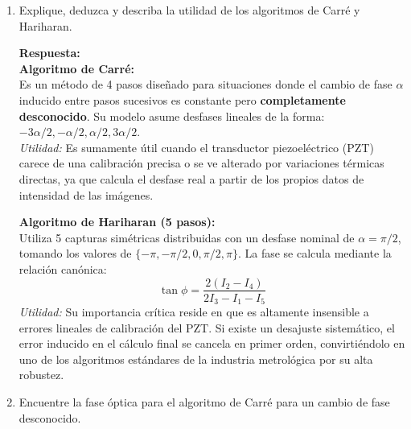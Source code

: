 \documentclass[12pt,letterpaper]{article}
\begin{document}
\begin{enumerate}
		\item[6.-] Explique, deduzca y describa la utilidad de los algoritmos de Carré y Hariharan.
		
		\vspace{0.3cm}
		\textbf{Respuesta:} \\
		\textbf{Algoritmo de Carré:} \\
		Es un método de 4 pasos diseñado para situaciones donde el cambio de fase $\alpha$ inducido entre pasos sucesivos es constante pero \textbf{completamente desconocido}. Su modelo asume desfases lineales de la forma: $-3\alpha/2, -\alpha/2, \alpha/2, 3\alpha/2$. \\
		\textit{Utilidad:} Es sumamente útil cuando el transductor piezoeléctrico (PZT) carece de una calibración precisa o se ve alterado por variaciones térmicas directas, ya que calcula el desfase real a partir de los propios datos de intensidad de las imágenes.
		
		\vspace{0.2cm}
		\textbf{Algoritmo de Hariharan (5 pasos):} \\
		Utiliza 5 capturas simétricas distribuidas con un desfase nominal de $\alpha = \pi/2$, tomando los valores de $\{- \pi, -\pi/2, 0, \pi/2, \pi\}$. La fase se calcula mediante la relación canónica:
		\[ \tan\phi = \frac{2(I_2 - I_4)}{2I_3 - I_1 - I_5} \]
		\textit{Utilidad:} Su importancia crítica reside en que es altamente insensible a errores lineales de calibración del PZT. Si existe un desajuste sistemático, el error inducido en el cálculo final se cancela en primer orden, convirtiéndolo en uno de los algoritmos estándares de la industria metrológica por su alta robustez.
		\vspace{0.5cm}
		
		\item[7.-] Encuentre la fase óptica para el algoritmo de Carré para un cambio de fase desconocido.
		

\end{enumerate}
\end{document}
